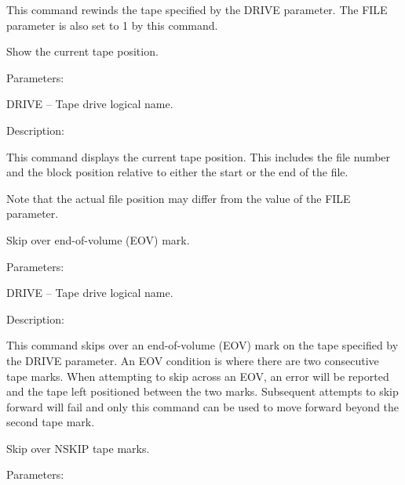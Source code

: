 \begin {description}
\begin {description}
This command rewinds the tape specified by the DRIVE parameter.
The FILE parameter is also set to 1 by this command.
\end {description}

\item [MTSHOW]
Show the current tape position.

\begin {description}
\item Parameters:

\begin {description}
\item DRIVE -- Tape drive logical name.
\end {description}

\item Description:

This command displays the current tape position.
This includes the file number and the block position relative to either 
the start or the end of the file.

Note that the actual file position may differ from the
value of the FILE parameter.
\end {description}

\item [MTSKIPEOV]
Skip over end-of-volume (EOV) mark.

\begin {description}
\item Parameters:

\begin {description}
\item DRIVE -- Tape drive logical name.
\end {description}

\item Description:

This command skips over an end-of-volume (EOV) mark on the tape specified 
by the DRIVE parameter.
An EOV condition is where there are two consecutive tape marks.
When attempting to skip across an EOV, an error will be reported
and the tape left positioned between the two marks.
Subsequent attempts to skip forward will fail and
only this command can be used to move forward beyond the
second tape mark.
\end {description}

\item [MTSKIPF]
Skip over NSKIP tape marks.

\begin {description}
\item Parameters:


\end{description}
\end{description}
